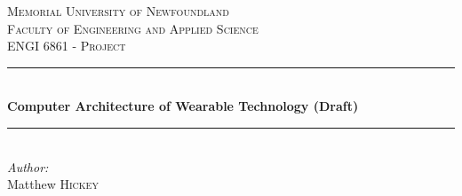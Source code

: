 \newcommand{\HRule}{\rule{\linewidth}{0.5mm}} %

\center %


\textsc{\LARGE Memorial University of Newfoundland}\\[1.5cm]
\textsc{\Large Faculty of Engineering and Applied Science}\\[0.5cm] %
\textsc{\large ENGI 6861 - Project}\\[0.5cm] %


\HRule \\[0.4cm]
{ \huge \bfseries Computer Architecture of Wearable Technology (Draft)}\\[0.4cm] %
\HRule \\[1.5cm]


\Large \emph{Author:}\\
Matthew \textsc{Hickey}\\[2cm] %


